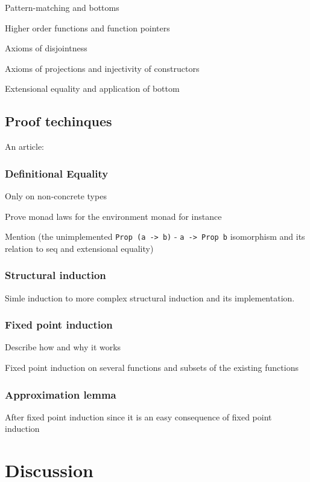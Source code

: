 \documentclass{report}
\begin{document}
Pattern-matching and bottoms

Higher order functions and function pointers

Axioms of disjointness

Axioms of projections and injectivity of constructors

Extensional equality and application of bottom

\section{Proof techinques}

An article:

\subsection{Definitional Equality}

Only on non-concrete types

Prove monad laws for the environment monad for instance

Mention (the unimplemented \verb;Prop (a -> b); - \verb;a -> Prop b; isomorphism and
its relation to seq and extensional equality)

\subsection{Structural induction}

Simle induction to more complex structural induction and its
implementation.

\subsection{Fixed point induction}

Describe how and why it works

Fixed point induction on several functions and subsets of the existing functions

\subsection{Approximation lemma}

After fixed point induction since it is an easy consequence of fixed
point induction

\chapter{Discussion}
\end{document}
